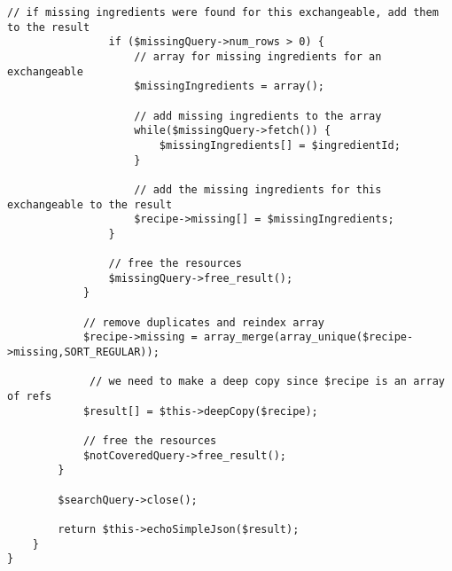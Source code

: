 \begin{lstlisting}[language=phpstyle, caption={Search by ingredients}]
                // if missing ingredients were found for this exchangeable, add them to the result
                if ($missingQuery->num_rows > 0) {
                    // array for missing ingredients for an exchangeable
            		$missingIngredients = array();

                    // add missing ingredients to the array
            		while($missingQuery->fetch()) {
            			$missingIngredients[] = $ingredientId;
            		}

                    // add the missing ingredients for this exchangeable to the result
            		$recipe->missing[] = $missingIngredients;
                }

                // free the resources
                $missingQuery->free_result();
        	}

        	// remove duplicates and reindex array
        	$recipe->missing = array_merge(array_unique($recipe->missing,SORT_REGULAR));

             // we need to make a deep copy since $recipe is an array of refs
        	$result[] = $this->deepCopy($recipe);

            // free the resources
            $notCoveredQuery->free_result();
        }

        $searchQuery->close();

        return $this->echoSimpleJson($result);
    }
}
\end{lstlisting}